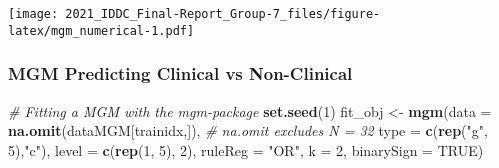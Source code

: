 \documentclass[
]{article}
\newenvironment{Shaded}{\begin{snugshade}}{\end{snugshade}}
\newcommand{\CommentTok}[1]{\textcolor[rgb]{0.56,0.35,0.01}{\textit{#1}}}
\newcommand{\DataTypeTok}[1]{\textcolor[rgb]{0.13,0.29,0.53}{#1}}
\newcommand{\DecValTok}[1]{\textcolor[rgb]{0.00,0.00,0.81}{#1}}
\newcommand{\KeywordTok}[1]{\textcolor[rgb]{0.13,0.29,0.53}{\textbf{#1}}}
\newcommand{\NormalTok}[1]{#1}
\newcommand{\OperatorTok}[1]{\textcolor[rgb]{0.81,0.36,0.00}{\textbf{#1}}}
\newcommand{\OtherTok}[1]{\textcolor[rgb]{0.56,0.35,0.01}{#1}}
\newcommand{\StringTok}[1]{\textcolor[rgb]{0.31,0.60,0.02}{#1}}
\begin{document}
\texttt{[image: 2021\_IDDC\_Final-Report\_Group-7\_files/figure-latex/mgm\_numerical-1.pdf]}

\hypertarget{mgm-predicting-clinical-vs-non-clinical}{%
\subsubsection{MGM Predicting Clinical vs
Non-Clinical}\label{mgm-predicting-clinical-vs-non-clinical}}

\begin{Shaded}
\end{Shaded}

\begin{Shaded}
\begin{Highlighting}[]
\CommentTok{# Fitting a MGM with the mgm-package}
\KeywordTok{set.seed}\NormalTok{(}\DecValTok{1}\NormalTok{)}
\NormalTok{fit_obj <-}\StringTok{ }\KeywordTok{mgm}\NormalTok{(}\DataTypeTok{data =} \KeywordTok{na.omit}\NormalTok{(dataMGM[trainidx,]), }\CommentTok{# na.omit excludes N = 32 }
                \DataTypeTok{type =} \KeywordTok{c}\NormalTok{(}\KeywordTok{rep}\NormalTok{(}\StringTok{"g"}\NormalTok{, }\DecValTok{5}\NormalTok{),}\StringTok{"c"}\NormalTok{),}
                \DataTypeTok{level =} \KeywordTok{c}\NormalTok{(}\KeywordTok{rep}\NormalTok{(}\DecValTok{1}\NormalTok{, }\DecValTok{5}\NormalTok{), }\DecValTok{2}\NormalTok{),}
                \DataTypeTok{ruleReg =} \StringTok{"OR"}\NormalTok{,}
                \DataTypeTok{k =} \DecValTok{2}\NormalTok{,}
                \DataTypeTok{binarySign =} \OtherTok{TRUE}\NormalTok{)}
\end{Highlighting}
\end{Shaded}
\end{document}
